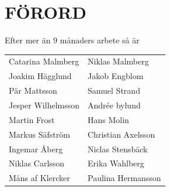 \documentclass[a6paper,fontsize=10pt,twoside,open=right]{scrbook}
\begin{document}
\section{FÖRORD}\vspace{10pt}
\hspace{10pt} Efter mer än 9 månaders arbete så är\par
\noindent
\begin{tabular}{@{}p{}p{}@{}}
  Catarina Malmberg & Niklas Malmberg\\
  Joakim Hägglund & Jakob Engblom\\
  Pär Mattsson & Samuel Strand\\
  Jesper Wilhelmsson & Andrée bylund\\
  Martin Frost & Hans Molin\\
  Markus Säfström & Christian Axelsson\\
  Ingemar Åberg & Niclas Stensbäck\\
  Niklas Carlsson & Erika Wahlberg\\
  Måns af Klercker & Paulina Hermansson
\end{tabular}\par
\end{document}
